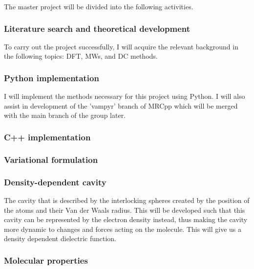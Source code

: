 \documentclass[a4paper,11pt]{article}
\begin{document}
The master project will be divided into the following activities.

\subsubsection{Literature search and theoretical development}

To carry out the project successfully, I will acquire the relevant
background in the following topics: \acl{DFT}, \aclp{MW}, and \acl{DC}
methods.

\subsubsection{Python implementation}

I will implement the methods necessary for this project using Python. I will also assist in development of the 'vampyr' branch of MRCpp which will be merged with the main branch of the group later.

\subsubsection{C++ implementation}

\subsubsection{Variational formulation}

\subsubsection{Density-dependent cavity}

The cavity that is described by the interlocking spheres created by the position of the atoms and their Van der Waals radius. This will be developed such that this cavity can be represented by the electron density instead, thus making the cavity more dynamic to changes and forces acting on the molecule. This will give us a density dependent dielectric function.

\subsubsection{Molecular properties}
\end{document}
